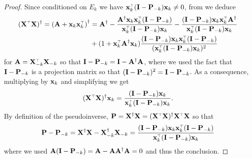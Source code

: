 \documentclass{article}
\begin{document}
\begin{proof}
Since conditioned on $E_k$ we have $\x_k^\top (\I - \P_{-k}) \x_k \neq 0$, from \cite[Theorem 1]{10.2307/2099767} we deduce
\begin{align*}
  (\X^\top \X)^\dag = \left( \A + \x_k \x_k^\top \right)^\dagger
  &= \A^\dag
  - \frac{\A^\dag \x_k \x_k^\top (\I - \P_{-k}) }{\x_k^\top ( \I - \P_{-k}) \x_k}
  - \frac{( \I -\P_{-k}) \x_k \x_k^\top \A^\dag}{\x_k^\top ( \I - \P_{-k}) \x_k} \\ 
  &+ (1 + \x_k^\top \A^\dag \x_k) \frac{(\I - \P_{-k}) \x_k \x_k^\top (\I - \P_{-k})}{(\x_k^\top (\I - \P_{-k}) \x_k)^2}
\end{align*}
for $\A = \X_{-k}^\top \X_{-k}$ so that $\mathbf I - \mathbf P_{-k} = \mathbf I - \mathbf A^\dagger \mathbf A$, where we used the fact that $\mathbf I - \mathbf P_{-k}$ is a projection matrix so that $(\mathbf I - \mathbf P_{-k})^2 = \mathbf I - \mathbf P_{-k}$. As a consequence, multiplying by $\mathbf x_k$ and simplifying we get
\[
  (\X^\top \X)^\dag \x_k = \frac{ ( \I -\P_{-k}) \x_k}{\x_k^\top (\I - \P_{-k}) \x_k}.
\]
By definition of the pseudoinverse, $\P = \X^\dagger \X = (\X^\top \X)^\dagger \X^\top \X$ so that 
\[
  \P - \P_{-k} = \X^\dagger \X - \X_{-k}^\dagger \X_{-k} = \frac{( \I - \P_{-k}) \x_k \x_k^\top ( \I - \P_{-k})}{\x_k^\top ( \I - \P_{-k}) \x_k}
\]
where we used $\mathbf A (\mathbf I - \mathbf P_{-k}) = \mathbf A - \mathbf A \mathbf A^\dagger \mathbf A = 0$ and thus the conclusion.
\end{proof}

\end{document}
